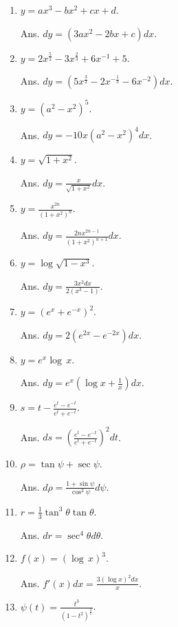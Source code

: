 \begin{enumerate}

\item
$y = ax^3 - bx^2 + cx + d$. 	

Ans. 	$dy = (3ax^2 - 2bx + c)dx$.

\item
$y = 2x^{\frac{5}{2}} - 3x^{\frac{2}{3}} + 6x^{-1} + 5$. 

Ans. $dy = (5x^{\frac{3}{2}} - 2x^{-\frac{1}{3}} - 6x^{-2})dx$.

\item
$y = (a^2 - x^2)^5$. 

Ans. $dy = - 10x(a^2 - x^2)^4dx$.

\item
$y = \sqrt{1 + x^2}$.

Ans. $dy = \frac{x}{\sqrt{1 + x^2}} dx$.

\item
$y = \frac{x^{2n}}{(1 + x^2)^n}$. 

Ans. $dy = \frac{2nx^{2n - 1}}{(1 + x^2)^{n + 1}} dx$.

\item
$y = \log \sqrt{1 - x^3}$.

Ans. $dy = \frac{3x^2 dx}{2(x^3 - 1)}$.

\item
$y = (e^x + e^{-x})^2$. 

Ans. $dy = 2(e^{2x} - e^{-2x})dx$.

\item
$y = e^x\log\, x$. 	

Ans. $dy = e^x \left ( \log x + \frac{1}{x} \right ) dx$.

\item
$s = t - \frac{e^t - e^{-t}}{e^t + e^{-t}}$. 

Ans. $ds = \left ( \frac{e^t - e^{-t}}{e^t + e^{-t}} \right )^2 dt$.

\item
$\rho = \tan\psi + \sec\psi$.

Ans. $ 	d\rho = \frac{1 + \sin \psi}{\cos^2 \psi} d\psi$.

\item
$r = \frac{1}{3} \tan^3 \theta \tan \theta$. 

Ans. $dr = \sec^4\theta d\theta$.

\item
$f(x) = (\log\, x)^3$. 	  	

Ans. $f'(x) dx = \frac{3(\log x)^2 dx}{x}$.
\item
$\psi(t) = \frac{t^3}{(1 - t^2)^{\frac{3}{2}}}$. 	  


\end{enumerate}

